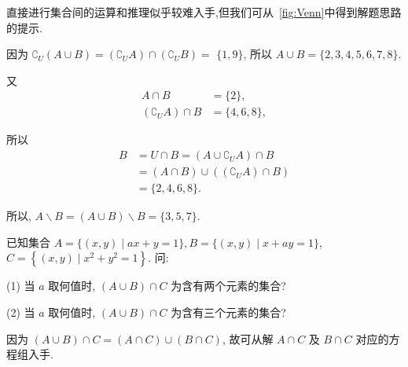 \begin{analysis}
	直接进行集合间的运算和推理似乎较难入手,但我们可从~\autoref{fig:Venn}中得到解题思路的提示.
\end{analysis}

\begin{solution}
	因为 $\complement_{U}(A \cup B)=\left(\complement_{U} A\right) \cap\left(\complement_{U} B\right)=$ $\{1,9\}$, 所以 $A \cup B=\{2,3,4,5,6,7,8\}$.

	又
	$$
		\begin{aligned}
			A \cap B                              & =\{2\},     \\
			\left(\complement_{U} A\right) \cap B & =\{4,6,8\},
		\end{aligned}
	$$




	所以
	$$
		\begin{aligned}
			B & =U \cap B=\left(A \cup \complement_{U} A\right) \cap B             \\
			  & =(A \cap B) \cup\left(\left(\complement_{U} A\right) \cap B\right) \\
			  & =\{2,4,6,8\} .
		\end{aligned}
	$$

	所以, $A \backslash B=(A \cup B) \backslash B=\{3,5,7\}$.

\end{solution}

\begin{example}
	已知集合 $A=\{(x, y) \mid a x+y=1\}, B=\{(x, y) \mid x+a y=1\}$, $C=\left\{(x, y) \mid x^{2}+y^{2}=1\right\}$. 问:

	(1) 当 $a$ 取何值时, $(A \cup B) \cap C$ 为含有两个元素的集合?

	(2) 当 $a$ 取何值时, $(A \cup B) \cap C$ 为含有三个元素的集合?

\end{example}

\begin{analysis}
	因为 $(A \cup B) \cap C=(A \cap C) \cup(B \cap C)$, 故可从解 $A \cap C$ 及 $B \cap C$ 对应的方程组入手.
\end{analysis}

